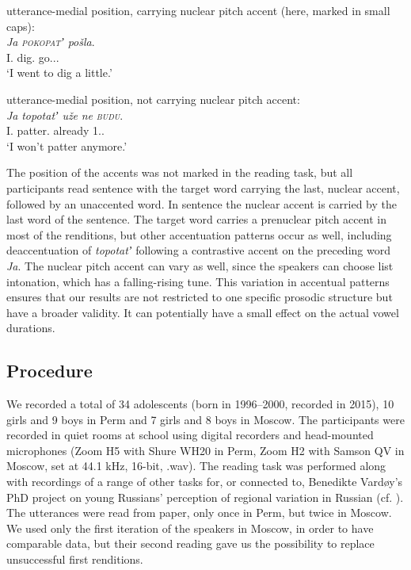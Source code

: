 \documentclass[output=paper,colorlinks,citecolor=black]{langscibook}
\begin{document}
\ea\label{post:ex:nuclear-pitch}utterance-medial position, carrying nuclear pitch accent (here, marked in small caps):\\
\gll \textit{Ja} \textit{\textsc{pokopatʼ}} \textit{pošla}.\\
I.{\NOM} dig.{\INF} go.{\FEM.\SG.\PST}\\
\glt `I went to dig a little.'
\z

\ea\label{post:ex:no-nuclear-pitch}utterance-medial position, not carrying nuclear pitch accent: \\
\gll \textit{Ja} \textit{topotatʼ} \textit{uže} \textit{ne} \textit{\textsc{budu}}.\\
I.{\NOM} patter.{\INF} already {\NEG} {1\SG.\IPFV.\FUT}\\
\glt `I won’t patter anymore.'
\z

\noindent The position of the accents was not marked in the reading task, but all parti\-cipants read sentence  with the target word carrying the last, nuclear accent, followed by an unaccented word. In sentence  the nuclear accent is carried by the last word of the sentence. The target word carries a prenuclear pitch accent in most of the renditions, but other accentuation patterns occur as well, including deaccentuation of \textit{topotatʼ} following a contrastive accent on the preceding word \textit{Ja}. The nuclear pitch accent can vary as well, since the speakers can choose list intonation, which has a falling-rising tune. This variation in accentual patterns ensures that our results are not restricted to one specific prosodic structure but have a broader validity. It can potentially have a small effect on the actual vowel durations.

\subsection{Procedure}\label{post:subsec:procedure}

We recorded a total of 34 adolescents (born in 1996--2000, recorded in 2015), 10 girls and 9 boys in Perm and 7 girls and 8 boys in Moscow. The participants were recorded in quiet rooms at school using digital recorders and head-mounted microphones (Zoom H5 with Shure WH20 in Perm, Zoom H2 with Samson QV in Moscow, set at 44.1 kHz, 16-bit, .wav). The reading task was performed along with recordings of a range of other tasks for, or connected to, Benedikte Vardøy’s PhD project on young Russians’ perception of regional variation in Russian (cf. \citealt{Vardøy2021,PostAndreeva2023}). The utterances were read from paper, only once in Perm, but twice in Moscow. We used only the first iteration of the speakers in Moscow, in order to have comparable data, but their second reading gave us the possibility to replace unsuccessful first renditions.
\end{document}
